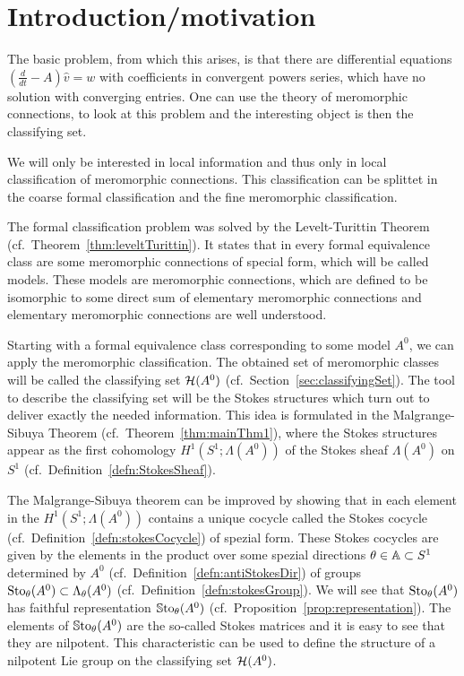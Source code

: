 \chapter{Introduction/motivation}


The basic problem, from which this  arises, is that
there are differential equations $(\frac{d}{dt}-A)\hat v=w$ with coefficients
in convergent powers series, which have no solution with converging entries.
One can use the theory of meromorphic connections, to look at this problem and
the interesting object is then the classifying set.



We will only be interested in local information and thus only in local
classification of meromorphic connections.
This classification can be splittet in the coarse formal classification and the
fine meromorphic classification.

The formal classification problem was solved by the Levelt-Turittin Theorem
(cf.\ Theorem~\ref{thm:leveltTurittin}). It states that in every formal
equivalence class are some meromorphic connections of special form, which will
be called models.
These models are meromorphic connections, which are defined to be isomorphic to
some direct sum of elementary meromorphic connections and elementary
meromorphic connections are well understood.

Starting with a formal equivalence class corresponding to some model $A^0$, we
can apply the meromorphic classification.
The obtained set of meromorphic classes will be called the classifying set
$\mathcal{H}(A^0)$ (cf.\ Section~\ref{sec:classifyingSet}).
The tool to describe the classifying set will be the Stokes structures which
turn out to deliver exactly the needed information.
This idea is formulated in the Malgrange-Sibuya Theorem
(cf.\ Theorem~\ref{thm:mainThm1}), where the Stokes structures appear as the
first cohomology $H^1(S^1;\Lambda(A^0))$ of the Stokes sheaf
$\Lambda(A^0)$ on $S^1$ (cf.\ Definition~\ref{defn:StokesSheaf}).

The Malgrange-Sibuya theorem can be improved by showing that in each element
in the $H^1(S^1;\Lambda(A^0))$ contains a unique cocycle called the Stokes
cocycle (cf.\ Definition~\ref{defn:stokesCocycle}) of spezial form.
These Stokes cocycles are given by the elements in the product over some
spezial directions $\theta\in\mathbb{A}\subset S^1$ determined by $A^0$
(cf.\ Definition~\ref{defn:antiStokesDir}) of groups
$\operatorname{Sto}_\theta(A^0)\subset\Lambda_\theta(A^0)$
(cf.\ Definition~\ref{defn:stokesGroup}).
We will see that $\operatorname{Sto}_\theta(A^0)$ has faithful representation
$\operatorname{\mathbb{S}to}_\theta(A^0)$ (cf.\ Proposition~\ref{prop:representation}).
The elements of $\operatorname{\mathbb{S}to}_\theta(A^0)$ are the so-called Stokes matrices and it is
easy to see that they are nilpotent.
This characteristic can be used to define the structure of a nilpotent Lie
group on the classifying set $\mathcal{H}(A^0)$.


